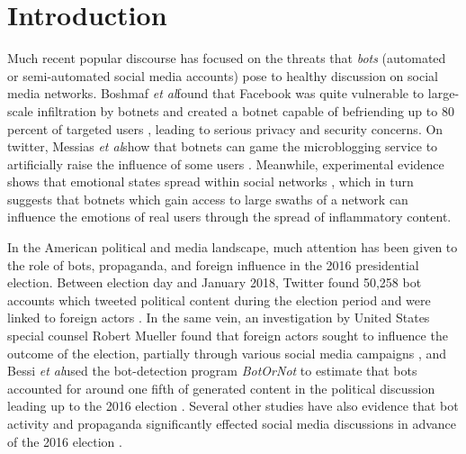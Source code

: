 \documentclass[sigconf,authordraft]{acmart}
\newcommand{\etal}{{\itshape et al}}
\begin{document}



\maketitle

\section{Introduction}


Much recent popular discourse has focused on the threats that {\itshape bots} (automated or semi-automated social media accounts) pose to healthy discussion on social media networks. Boshmaf \etal found that Facebook was quite vulnerable to large-scale infiltration by botnets and created a botnet capable of befriending up to 80 percent of targeted users \cite{boshmaf2013design}, leading to serious privacy and security concerns. On twitter, Messias \etal show that botnets can game the microblogging service to artificially raise the influence of some users \cite{messias2013you}. Meanwhile, experimental evidence shows that emotional states spread within social networks \cite{kramer2014experimental}, which in turn suggests that botnets which gain access to large swaths of a network can influence the emotions of real users through the spread of inflammatory content. 

In the American political and media landscape, much attention has been given to the role of bots, propaganda, and foreign influence in the 2016 presidential election. Between election day and January 2018, Twitter found 50,258 bot accounts which tweeted political content during the election period and were linked to foreign actors \cite{Twitter2016BotReport}. In the same vein, an investigation by United States special counsel Robert Mueller found that foreign actors sought to influence the outcome of the election, partially through various social media campaigns \cite{mueller2019report}, and Bessi \etal used the bot-detection program {\itshape BotOrNot} \cite{davis2016botornot} to estimate that bots accounted for around one fifth of generated content in the political discussion leading up to the 2016 election \cite{bessi2016social}. Several other studies have also evidence that bot activity and propaganda significantly effected social media discussions in advance of the 2016 election \cite{howard2017junk, badawy2018analyzing, woolley2017computational}.
\end{document}
